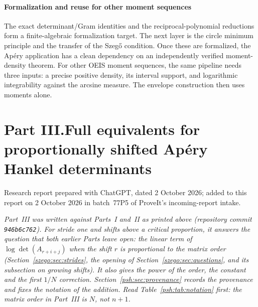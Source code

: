 \documentclass[11pt,a4paper]{article}
\numberwithin{equation}{section}
\theoremstyle{remark}\newtheorem{remark}[theorem]{Remark}
\begin{document}
\subsection{Formalization and reuse for other moment sequences}
The exact determinant/Gram identities and the reciprocal-polynomial
reductions form a finite-algebraic formalization target. The next layer is
the circle minimum principle and the transfer of the Szeg\H{o} condition.
Once these are formalized, the Ap\'ery application has a clean dependency
on an independently verified moment-density theorem.
For other OEIS moment sequences, the same pipeline needs three inputs:
a precise positive density, its interval support, and logarithmic
integrability against the arcsine measure. The envelope construction then
uses moments alone.


\clearpage
{}\part*{Part III.\quad Full equivalents for proportionally shifted Ap\'ery Hankel determinants}

\par\smallskip
\noindent Research report prepared with ChatGPT, dated 2 October 2026;
added to this report on 2 October 2026 in batch~77P5 of ProveIt's
incoming-report intake.\par\medskip

\noindent\emph{Part~III was written against Parts~I and~II as printed above
(repository commit \texttt{946b6c762}). For stride one and shifts above a
critical proportion, it answers the question that both earlier Parts leave
open: the linear term of $\log\det(A_{r+i+j})$ when the shift $r$ is
proportional to the matrix order (Section~\ref{szego:sec:strides}, the
opening of Section~\ref{szego:sec:questions}, and its subsection on growing
shifts). It also gives the power of the order, the constant and the first
$1/N$ correction. Section~\ref{psh:sec:provenance} records the provenance and
fixes the notation of the addition. Read Table~\ref{psh:tab:notation} first:
the matrix order in Part~III is $N$, not $n+1$.}
\end{document}
